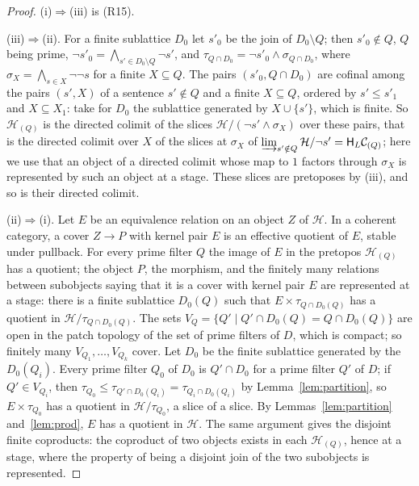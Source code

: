 \documentclass[11pt]{amsart}
\theoremstyle{definition}
\newcommand{\HH}{\mathsf H}
\newcommand{\cC}{\mathcal C}
\newcommand{\cH}{\mathcal H}
\begin{document}
\begin{proof}
(i)$\Rightarrow$(iii) is (R15).

(iii)$\Rightarrow$(ii). For a finite sublattice $D_0$ let $s'_0$ be
the join of $D_0\setminus Q$; then $s'_0\notin Q$, $Q$ being prime,
$\neg s'_0=\bigwedge_{s'\in D_0\setminus Q}\neg s'$, and
$\tau_{Q\cap D_0}=\neg s'_0\wedge\sigma_{Q\cap D_0}$, where
$\sigma_X=\bigwedge_{s\in X}\neg\neg s$ for a finite $X\subseteq Q$.
The pairs $(s'_0,Q\cap D_0)$ are cofinal among the pairs $(s',X)$ of a
sentence $s'\notin Q$ and a finite $X\subseteq Q$, ordered by $s'\le
s'_1$ and $X\subseteq X_1$: take for $D_0$ the sublattice generated by
$X\cup\{s'\}$, which is finite. So $\cH_{(Q)}$ is the directed colimit
of the slices $\cH/(\neg s'\wedge\sigma_X)$ over these pairs, that is
the directed colimit over $X$ of the slices at $\sigma_X$ of
$\varinjlim_{s'\notin Q}\cH/\neg s'=\HH_L\cC_{(Q)}$; here we use that
an object of a directed colimit whose map to $1$ factors through
$\sigma_X$ is represented by such an object at a stage. These slices
are pretoposes by (iii), and so is their directed colimit.

(ii)$\Rightarrow$(i). Let $E$ be an equivalence relation on an object
$Z$ of $\cH$. In a coherent category, a cover $Z\to P$ with kernel
pair $E$ is an effective quotient of $E$, stable under pullback. For
every prime filter $Q$ the image of $E$ in the pretopos $\cH_{(Q)}$
has a quotient; the object $P$, the morphism, and the finitely many
relations between subobjects saying that it is a cover with kernel
pair $E$ are represented at a stage: there is a finite sublattice
$D_0(Q)$ such that $E\times\tau_{Q\cap D_0(Q)}$ has a quotient in
$\cH/\tau_{Q\cap D_0(Q)}$. The sets $V_Q=\{Q'\mid Q'\cap D_0(Q)=Q\cap
D_0(Q)\}$ are open in the patch topology of the set of prime filters
of $D$, which is compact; so finitely many $V_{Q_1},\dots,V_{Q_k}$
cover. Let $D_0$ be the finite sublattice generated by the
$D_0(Q_i)$. Every prime filter $Q_0$ of $D_0$ is $Q'\cap D_0$ for a
prime filter $Q'$ of $D$; if $Q'\in V_{Q_i}$, then
$\tau_{Q_0}\le\tau_{Q'\cap D_0(Q_i)}=\tau_{Q_i\cap D_0(Q_i)}$ by
Lemma~\ref{lem:partition}, so $E\times\tau_{Q_0}$ has a quotient in
$\cH/\tau_{Q_0}$, a slice of a slice. By Lemmas~\ref{lem:partition}
and~\ref{lem:prod}, $E$ has a quotient in $\cH$. The same argument
gives the disjoint finite coproducts: the coproduct of two objects
exists in each $\cH_{(Q)}$, hence at a stage, where the property of
being a disjoint join of the two subobjects is represented.
\end{proof}
\end{document}
